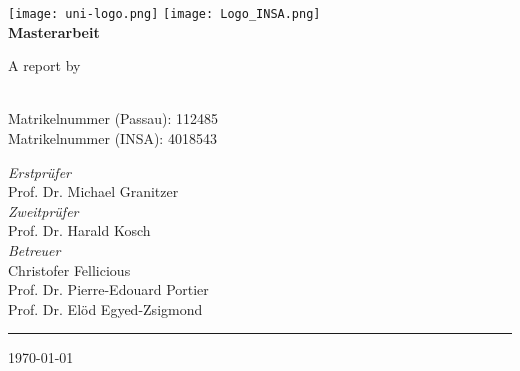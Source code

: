 \begin{titlepage}
    \centering
    \begin{onehalfspace}
    	
        	\texttt{[image: uni-logo.png]}
			\hspace*{1.0cm}
			\texttt{[image: Logo\_INSA.png]}\\
        	\vspace{1.0cm}
        	{\Large \bfseries Masterarbeit}\\

        	\vspace{2.5cm}

            \begin{doublespace}
            	{\textsf{\Huge{\thetitle}}}
            \end{doublespace}

        	\vspace{2cm}

            {\Large A report by}\\

        	\vspace{1cm}

        	{\bfseries \large{\theauthor}} \\
			\vspace{0.5cm}
			Matrikelnummer (Passau): 112485 \\
			Matrikelnummer (INSA): 4018543 \\


        	\vfill

        	{\Large
                \textit{Erstpr\"ufer} \\
                Prof. Dr. Michael Granitzer\\
				\textit{Zweitpr\"ufer} \\
				Prof. Dr. Harald Kosch \\
				\vspace{0.5cm}
				\textit{Betreuer} \\
				Christofer Fellicious\\
				Prof. Dr. Pierre-Edouard Portier\\
				Prof. Dr. Elöd Egyed-Zsigmond\\
        	}

        	\vspace{1cm}

        	\parbox{\linewidth}{\hrule\strut}

            \vfill

			{\large \today}
    \end{onehalfspace}
\end{titlepage}
